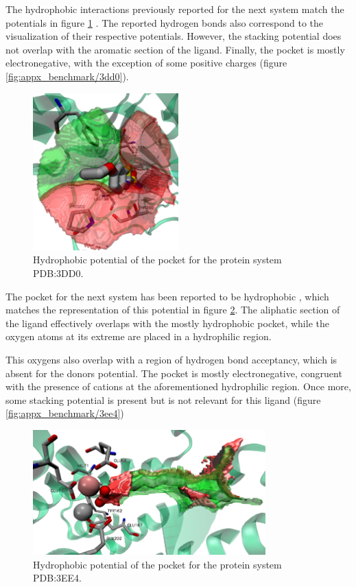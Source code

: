     The hydrophobic interactions previously reported for the next system match the potentials in figure \ref{fig:benchmark/3dd0} \cite{benchmark_strong_2021}. The reported hydrogen bonds also correspond to the visualization of their respective potentials. However, the stacking potential does not overlap with the aromatic section of the ligand. Finally, the pocket is mostly electronegative, with the exception of some positive charges (figure \ref{fig:appx_benchmark/3dd0}).

    \begin{figure}[H]
      \centering
      \includegraphics[width=0.5\textwidth]{figures/results/benchmark_prot/3dd0.png}
      \caption{\label{fig:benchmark/3dd0} Hydrophobic potential of the pocket for the protein system PDB:3DD0.}
    \end{figure}

    The pocket for the next system has been reported to be hydrophobic \cite{benchmark_hydrophobic_2009}, which matches the representation of this potential in figure \ref{fig:benchmark/3ee4}. The aliphatic section of the ligand effectively overlaps with the mostly hydrophobic pocket, while the oxygen atoms at its extreme are placed in a hydrophilic region.

    This oxygens also overlap with a region of hydrogen bond acceptancy, which is absent for the donors potential. The pocket is mostly electronegative, congruent with the presence of cations at the aforementioned hydrophilic region. Once more, some stacking potential is present but is not relevant for this ligand (figure \ref{fig:appx_benchmark/3ee4})

    \begin{figure}[H]
      \centering
      \includegraphics[width=0.8\textwidth]{figures/results/benchmark_prot/3ee4.png}
      \caption{\label{fig:benchmark/3ee4} Hydrophobic potential of the pocket for the protein system PDB:3EE4.}
    \end{figure}

